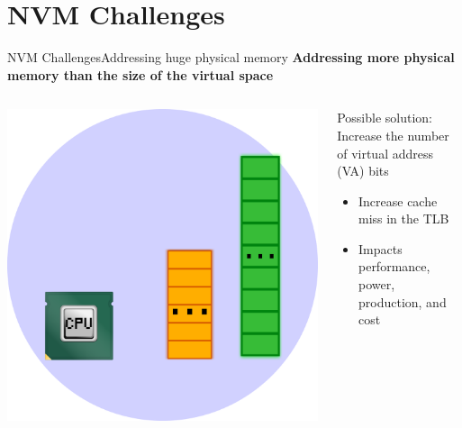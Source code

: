 \documentclass[10pt]{beamer}
\begin{document}
\section{NVM Challenges}
\begin{frame}{NVM Challenges}{Addressing huge physical memory}
  \textbf{Addressing more physical memory than the size of the virtual space}

  \begin{columns}[T]
    \begin{column}{.2\textwidth}
      \includegraphics[width=1.8\textwidth, keepaspectratio=true]{images/increase_physical_address.png}
    \end{column} \pause

    \hfill
    \begin{column}{.7\textwidth}
      Possible solution: Increase the number of virtual address (VA) bits \pause
      \begin{itemize}
        \item Increase cache miss in the TLB\pause
        \item Impacts performance, power, production, and cost
      \end{itemize}
    \end{column}
  \end{columns}
\end{frame}
\end{document}
